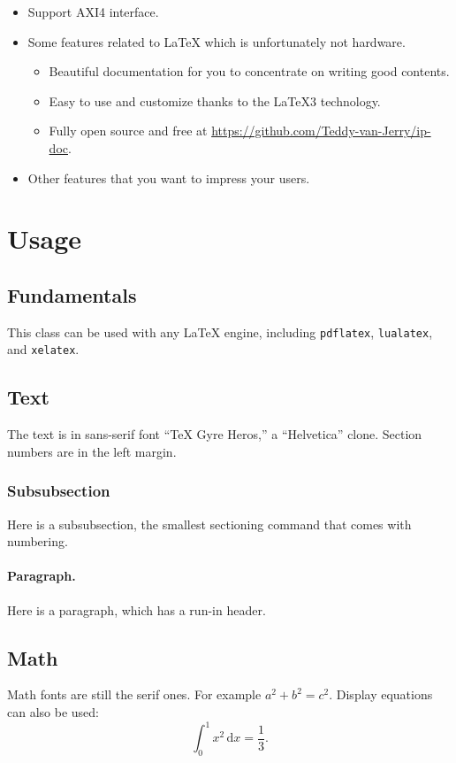 \documentclass{ip-doc}
\begin{document}
\begin{itemize}
  \item Support AXI4 interface.
  \item Some features related to \LaTeX{} which is unfortunately not hardware.
  \begin{itemize}
    \item Beautiful documentation for you to concentrate on writing good contents.
    \item Easy to use and customize thanks to the LaTeX3 technology.
    \item Fully open source and free at \url{https://github.com/Teddy-van-Jerry/ip-doc}.
  \end{itemize}
  \item Other features that you want to impress your users.
\end{itemize}

\section{Usage}

\subsection{Fundamentals}
This class can be used with any \LaTeX{} engine,
including \texttt{pdflatex}, \texttt{lualatex}, and \texttt{xelatex}.

\subsection{Text}
The text is in sans-serif font ``TeX Gyre Heros,'' a ``Helvetica'' clone.
Section numbers are in the left margin.

\subsubsection{Subsubsection}
Here is a subsubsection, the smallest sectioning command that comes with numbering.

\paragraph{Paragraph.}
Here is a paragraph, which has a run-in header.

\subsection{Math}
Math fonts are still the serif ones.
For example $a^2 + b^2 = c^2$.
Display equations can also be used:
\begin{equation}
  \int_0^1 x^2 \, \mathrm{d}x = \frac13.
\end{equation}
\end{document}
